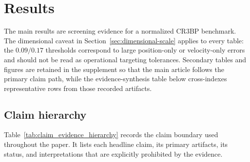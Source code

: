 \documentclass[preprint,12pt]{elsarticle}
\begin{document}
\section{Results}

The main results are screening evidence for a normalized CR3BP benchmark. The dimensional caveat in Section~\ref{sec:dimensional-scale} applies to every table: the $0.09/0.17$ thresholds correspond to large position-only or velocity-only errors and should not be read as operational targeting tolerances. Secondary tables and figures are retained in the supplement so that the main article follows the primary claim path, while the evidence-synthesis table below cross-indexes representative rows from those recorded artifacts.

\subsection{Claim hierarchy}

Table~\ref{tab:claim_evidence_hierarchy} records the claim boundary used throughout the paper. It lists each headline claim, its primary artifacts, its status, and interpretations that are explicitly prohibited by the evidence.
\end{document}
